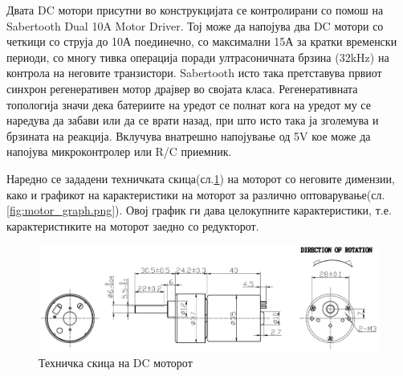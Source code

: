\documentclass[12pt]{article}
\begin{document}

		  Двата DC мотори присутни во конструкцијата се контролирани со помош на Sabertooth Dual 10A Motor Driver. Тој може да напојува два DC мотори со четкици со струја до 10А поединечно, со максимални 15А за кратки временски периоди, со многу тивка операција поради ултрасоничната брзина (32kHz) на контрола на неговите транзистори. Sabertooth исто така претставува првиот синхрон регенеративен мотор драјвер во својата класа. Регенеративната топологија значи дека батериите на уредот се полнат кога на уредот му се наредува да забави или да се врати назад, при што исто така ја зголемува и брзината на реакција. Вклучува внатрешно напојување од 5V кое може да напојува микроконтролер или R/C приемник.

		  Наредно се зададени техничката скица(сл.\ref{fig:motor_schematic.png}) на моторот со неговите димензии, како и графикот на карактеристики на моторот за различно оптоварување(сл.\ref{fig:motor_graph.png}). Овој график ги дава целокупните карактеристики, т.е. карактеристиките на моторот заедно со редукторот.

      \begin{figure}[H]
        \includegraphics[width=0.75\linewidth]{./images/motor_schematic.png}
		    \centering
        \caption{Техничка скица на DC моторот}
		    \label{fig:motor_schematic.png}
		    \end{figure}
\end{document}
